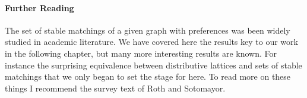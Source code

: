 \paragraph{Further Reading}
The set of stable matchings of a given graph with preferences was been widely studied in academic literature. We have covered here the results key to our work in the following chapter, but many more interesting results are known. For instance the surprising equivalence between distributive lattices and sets of stable matchings that we only began to set the stage for here. To read more on these things I recommend the survey text of Roth and Sotomayor\cite{roth1992two}.